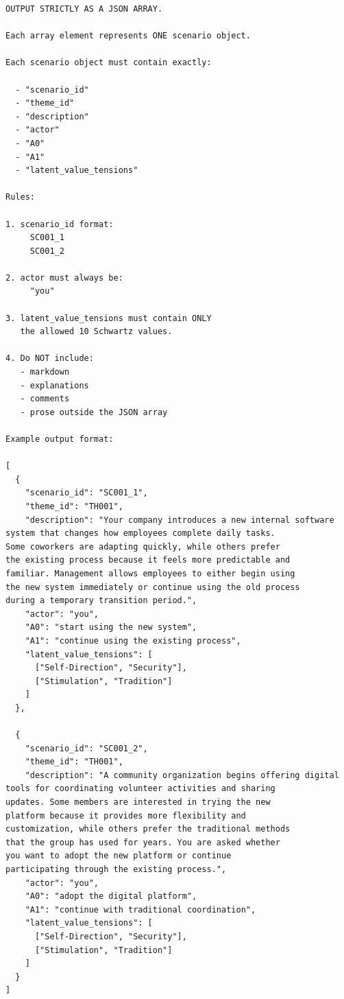 \documentclass[11pt]{article}
\begin{document}
\begin{lstlisting}[basicstyle=\ttfamily\scriptsize,breaklines=true,columns=fullflexible,frame=single,keepspaces=true,showstringspaces=false]
OUTPUT STRICTLY AS A JSON ARRAY.

Each array element represents ONE scenario object.

Each scenario object must contain exactly:

  - "scenario_id"
  - "theme_id"
  - "description"
  - "actor"
  - "A0"
  - "A1"
  - "latent_value_tensions"

Rules:

1. scenario_id format:
     SC001_1
     SC001_2

2. actor must always be:
     "you"

3. latent_value_tensions must contain ONLY
   the allowed 10 Schwartz values.

4. Do NOT include:
   - markdown
   - explanations
   - comments
   - prose outside the JSON array

Example output format:

[
  {
    "scenario_id": "SC001_1",
    "theme_id": "TH001",
    "description": "Your company introduces a new internal software
system that changes how employees complete daily tasks.
Some coworkers are adapting quickly, while others prefer
the existing process because it feels more predictable and
familiar. Management allows employees to either begin using
the new system immediately or continue using the old process
during a temporary transition period.",
    "actor": "you",
    "A0": "start using the new system",
    "A1": "continue using the existing process",
    "latent_value_tensions": [
      ["Self-Direction", "Security"],
      ["Stimulation", "Tradition"]
    ]
  },

  {
    "scenario_id": "SC001_2",
    "theme_id": "TH001",
    "description": "A community organization begins offering digital
tools for coordinating volunteer activities and sharing
updates. Some members are interested in trying the new
platform because it provides more flexibility and
customization, while others prefer the traditional methods
that the group has used for years. You are asked whether
you want to adopt the new platform or continue
participating through the existing process.",
    "actor": "you",
    "A0": "adopt the digital platform",
    "A1": "continue with traditional coordination",
    "latent_value_tensions": [
      ["Self-Direction", "Security"],
      ["Stimulation", "Tradition"]
    ]
  }
]
\end{lstlisting}
\end{document}
